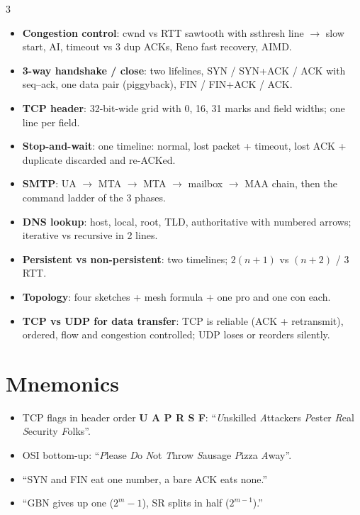\begin{multicols*}{3}
\begin{itemize}
  \item \textbf{Congestion control}: cwnd vs RTT sawtooth with ssthresh line $\to$ slow start, AI, timeout vs 3 dup ACKs, Reno fast recovery, AIMD.
  \item \textbf{3-way handshake / close}: two lifelines, SYN / SYN+ACK / ACK with seq--ack, one data pair (piggyback), FIN / FIN+ACK / ACK.
  \item \textbf{TCP header}: 32-bit-wide grid with 0, 16, 31 marks and field widths; one line per field.
  \item \textbf{Stop-and-wait}: one timeline: normal, lost packet + timeout, lost ACK + duplicate discarded and re-ACKed.
  \item \textbf{SMTP}: UA $\to$ MTA $\to$ MTA $\to$ mailbox $\to$ MAA chain, then the command ladder of the 3 phases.
  \item \textbf{DNS lookup}: host, local, root, TLD, authoritative with numbered arrows; iterative vs recursive in 2 lines.
  \item \textbf{Persistent vs non-persistent}: two timelines; $2(n{+}1)$ vs $(n{+}2)$ / 3 RTT.
  \item \textbf{Topology}: four sketches + mesh formula + one pro and one con each.
  \item \textbf{TCP vs UDP for data transfer}: TCP is reliable (ACK + retransmit), ordered, flow and congestion controlled; UDP loses or reorders silently.
\end{itemize}

\section*{Mnemonics}
\begin{itemize}
  \item TCP flags in header order \textbf{U A P R S F}: ``\emph{U}nskilled \emph{A}ttackers \emph{P}ester \emph{R}eal \emph{S}ecurity \emph{F}olks''.
  \item OSI bottom-up: ``\emph{P}lease \emph{D}o \emph{N}ot \emph{T}hrow \emph{S}ausage \emph{P}izza \emph{A}way''.
  \item ``SYN and FIN eat one number, a bare ACK eats none.''
  \item ``GBN gives up one ($2^m-1$), SR splits in half ($2^{m-1}$).''
\end{itemize}
\end{multicols*}
